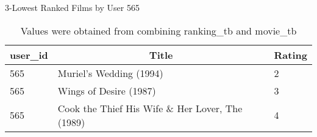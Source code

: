 \begin{table}[!htbp]
	\caption{3-Lowest Ranked Films by User 565} \label{tab:higest-565}
	\begin{center}
	\vspace{-5mm}
		\begin{tabular}{ l l l }
			\hline
			\multicolumn{1}{c}{user\_id} & \multicolumn{1}{c}{Title} & \multicolumn{1}{c}{Rating}\\
			\hline
     		565 & Muriel's Wedding (1994)                          &      2\\
     		565 & Wings of Desire (1987)                           &      3\\
     		565 & Cook the Thief His Wife \& Her Lover, The (1989) &      4\\
			\hline
		\end{tabular}
	\caption*{\scriptsize Values were obtained from combining ranking\_tb and movie\_tb}
	 \end{center}
\end{table}